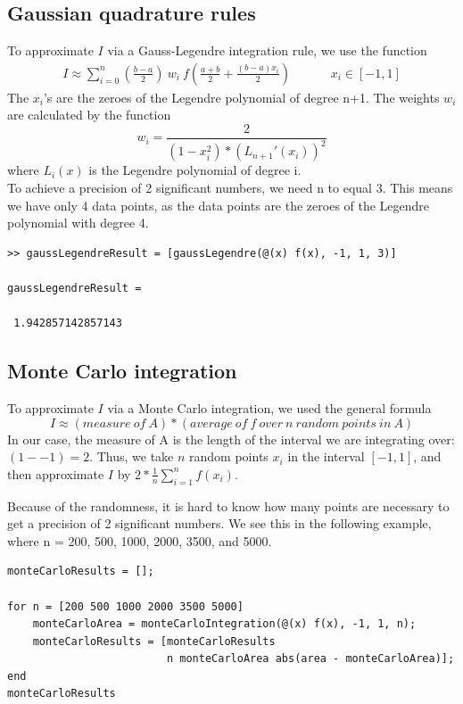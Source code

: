\documentclass[11pt, a4paper, titlepage, openright]{article}
\begin{document}
\newpage
\subsection{Gaussian quadrature rules}
To approximate \( I \) via a Gauss-Legendre integration rule, we use the function
\[
 \begin{aligned}
 I \approx \sum_{i=0}^{n} (\frac{b - a}{2}) \ w_i \ f(\frac{a + b}{2} + \frac{(b - a) x_i}{2}) &&&& x_i \in [-1, 1]
 \end{aligned}
 \]
The \(x_i\)'s are the zeroes of the Legendre polynomial of degree n+1.
The weights \( w_i \) are calculated by the function
\[
    w_i = \frac{2}{(1 - x_i^2) * (L_{n+1}'(x_i))^2}
\]
where \( L_i(x) \) is the Legendre polynomial of degree i. \\

To achieve a precision of 2 significant numbers, we need n to equal 3. This means we have only 4 data points, as the
data points are the zeroes of the Legendre polynomial with degree 4.
\begin{lstlisting}
>> gaussLegendreResult = [gaussLegendre(@(x) f(x), -1, 1, 3)]

gaussLegendreResult =

 1.942857142857143
\end{lstlisting}


\subsection{Monte Carlo integration}
To approximate \( I \) via a Monte Carlo integration, we used the general formula
    \[ I \approx (measure\ of\ A) * (average\ of\ f\ over\ n\ random\ points\ in\ A) \]
In our case, the measure of A is the length of the interval we are integrating over: \((1 - -1) = 2\).
Thus, we take \(n\) random points \( x_i \) in the interval \( [-1, 1] \), and then approximate \(I\) by \( 2 * \frac{1}{n} \sum_{i = 1}^{n} f(x_i) \).

Because of the randomness, it is hard to know how many points are necessary to get a precision of
2 significant numbers. We see this in the following example, where n = 200, 500, 1000, 2000, 3500, and 5000.
\begin{lstlisting}
monteCarloResults = [];

for n = [200 500 1000 2000 3500 5000]
    monteCarloArea = monteCarloIntegration(@(x) f(x), -1, 1, n);
    monteCarloResults = [monteCarloResults
                         n monteCarloArea abs(area - monteCarloArea)];
end
monteCarloResults
\end{lstlisting}
\end{document}
